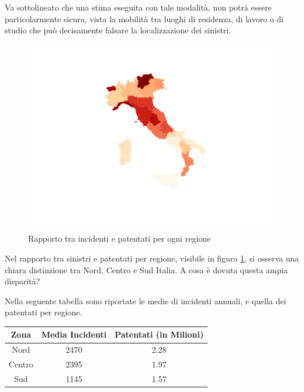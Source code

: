 \documentclass[a4paper]{report}
\begin{document}
Va sottolineato che una stima eseguita con tale modalità, 
non potrà essere particolarmente 
sicura, vista la mobilità tra luoghi di residenza, di 
lavoro o di studio che può decisamente falsare la localizzazione dei sinistri.

\begin{figure}
    \hfill\includegraphics[width=\linewidth]{../src/incidenti/incidenti_aci/mappe_regioni/incidenti_patenti_italia.png}\hspace*{\fill}
    \caption{Rapporto tra incidenti e patentati per ogni regione}
    \label{fig:incidenti-patentati}
\end{figure}

Nel rapporto tra sinistri e patentati per regione, 
visibile in figura \ref{fig:incidenti-patentati}, 
si osserva una chiara distinzione tra Nord, Centro e Sud Italia. 
A cosa è dovuta questa ampia disparità?

Nella seguente tabella sono riportate le medie di incidenti annuali, 
e quella dei patentati per regione. 

\begin{center}
    \def\arraystretch{1.5}%
    \begin{tabular}{ |c|c|c| } 
    \hline
    Zona & Media Incidenti & Patentati (in Milioni) \\ 
    \hline
    \rowcolor{TableGray}
    Nord    &   2470 &   2.28 \\ 
    Centro  &   2395 &   1.97 \\ 
    \rowcolor{TableGray}
    Sud     &   1145 &   1.57 \\ 
    \hline
    \end{tabular}
\end{center}
\end{document}
